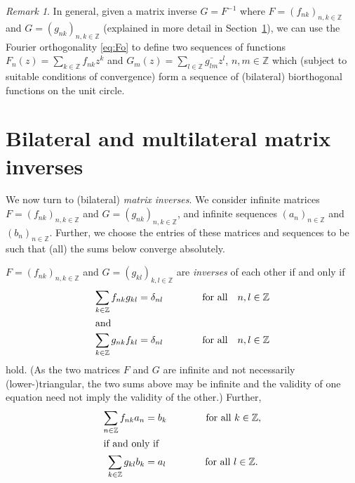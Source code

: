 \documentclass[reqno,12pt]{amsart}
\theoremstyle{remark}
\newtheorem{remark}{Remark}
\numberwithin{equation}{section}
\begin{document}
\begin{remark}
  In general, given a matrix inverse $G=F^{-1}$ where
$F=(f_{nk})_{n,k\in\mathbb Z}$ and
$G=(g_{nk})_{n,k\in\mathbb Z}$ (explained in more detail in
Section~\ref{sec:mi}),
we can use the Fourier orthogonality \eqref{eq:Fo} to
define two sequences of functions $F_n(z)=\sum_{k\in\mathbb Z}f_{nk}z^k$
and $G_m(z)=\sum_{l\in\mathbb Z}\bar{g_{lm}}z^l$,
$n,m\in\mathbb Z$
which (subject to suitable conditions of convergence)
form a sequence of (bilateral) biorthogonal functions
on the unit circle.  
\end{remark}


\section[Bilateral and multilateral matrix inverses]{Bilateral
  and multilateral matrix inverses}\label{sec:mi}

We now turn to (bilateral) \textit{matrix inverses}.
We consider infinite matrices
$F=(f_{nk})_{n,k\in\mathbb Z}$ and
$G=(g_{nk})_{n,k\in\mathbb Z}$, and infinite sequences
$(a_n)_{n\in\mathbb Z}$ and $(b_n)_{n\in\mathbb Z}$.
Further, we choose the entries of these matrices and sequences
to be such that (all) the sums below converge absolutely.

$F=(f_{nk})_{n,k\in\mathbb Z}$ and $G=(g_{kl})_{k,l\in\mathbb Z}$ are
\textit{inverses} of each other if and only if
\begin{align*}
  \sum _{k\in\mathbb Z}f_{nk}g_{kl}&=\delta_{nl}\qquad\qquad
  \text {for all}\quad n,l\in\mathbb Z\\
  \intertext{and}
  \sum _{k\in\mathbb Z}g_{nk}f_{kl}&=\delta_{nl}\qquad\qquad
\text {for all}\quad n,l\in\mathbb Z
\end{align*}
hold. (As the two matrices $F$ and $G$
are infinite and not necessarily (lower-)triangular,
the two sums above may be infinite and the validity
of one equation need not imply the validity of the other.)
Further,
\begin{subequations}\label{eq:fg}
\begin{align}
  \sum _{n\in\mathbb Z}f_{n k}a_{n}&=b_{k}\qquad\qquad
  \text {for all $k\in\mathbb Z$,}\label{eq:fab}\\
\intertext{if and only if}
  \sum _{k\in\mathbb Z}g_{k l}b_{k}&=a_{l}\qquad\qquad
  \text {for all $l\in\mathbb Z$.}\label{eq:gba}
\end{align}
\end{subequations}
\end{document}
